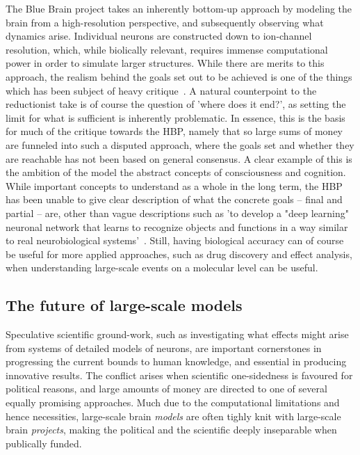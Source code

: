 \documentclass[10pt]{article}\usepackage[]{graphicx}\usepackage[]{color}
\theoremstyle{plain}
\begin{document}
\begin{multicols*}{2}
	The Blue Brain project takes an inherently bottom-up approach by modeling the brain from a high-resolution perspective, and subsequently observing what dynamics arise. Individual neurons are constructed down to ion-channel resolution, which, while biolically relevant, requires immense computational power in order to simulate larger structures. While there are merits to this approach, the realism behind the goals set out to be achieved is one of the things which has been subject of heavy critique~\cite{theil2015human}. A natural counterpoint to the reductionist take is of course the question of 'where does it end?', as setting the limit for what is sufficient is inherently problematic. In essence, this is the basis for much of the critique towards the HBP, namely that so large sums of money are funneled into such a disputed approach, where the goals set and whether they are reachable has not been based on general consensus. 
	A clear example of this is the ambition of the model the abstract concepts of consciousness and cognition. While important concepts to understand as a whole in the long term, the HBP has been unable to give clear description of what the concrete goals -- final and partial -- are, other than vague descriptions such as 'to develop a "deep learning" neuronal network that learns to recognize objects and functions in a way similar to real neurobiological systems'~\cite{understanding_cognition_2017}. Still, having biological accuracy can of course be useful for more applied approaches, such as drug discovery and effect analysis, when understanding large-scale events on a molecular level can be useful.
					        
	\subsection*{The future of large-scale models}
	  Speculative scientific ground-work, such as investigating what effects might arise from systems of detailed models of neurons, are important cornerstones in progressing the current bounds to human knowledge, and essential in producing innovative results. The conflict arises when scientific one-sidedness is favoured for political reasons, and large amounts of money are directed to one of several equally promising approaches. Much due to the computational limitations and hence necessities, large-scale brain \textit{models} are often tighly knit with large-scale brain \textit{projects}, making the political and the scientific deeply inseparable when publically funded. 


\end{multicols*}
\end{document}
